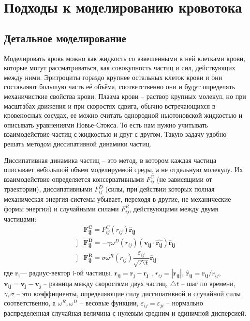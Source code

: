 \section{Подходы к моделированию кровотока}
\subsection{Детальное моделирование}
Моделировать кровь можно как жидкость со взвешенными в ней клетками крови, которые могут рассматриваться, как совокупность частиц и сил, действующих между ними. Эритроциты гораздо крупнее остальных клеток крови и они составляют большую часть её объёма, соответственно они и будут определять механичисткие свойства крови. Плазма крови -- раствор крупных молекул, но при масштабах движения и при скоростях сдвига, обычно встречающихся в кровеносных сосудах, ее можно считать однородной ньютоновской жидкостью  и описывать уравнениями Новье-Стокса. То есть нам нужно учитывать взаимодействие частиц с жидкостью и друг с другом. Такую задачу удобно решать методом диссипативной динамики частиц.

Диссипативная динамика частиц -- это метод, в котором каждая частица описывает небольшой объем моделируемой среды, а не отдельную молекулу. Их взаимодействие определяется консервативными $F^C_{ij}$ (не зависящими от 
траектории), диссипативными $F^D_{ij}$ (силы, при действии которых полная механическая энергия  системы убывает, переходя в другие, не механические формы энергии) и случайными силами $F^R_{ij}$, действующими между двумя частицами:
\begin{align*}
  &\mathbf{F^C_{ij}}=F^C_{ij}(r_{ij})\mathbf{\hat{r}{_{ij}}}\\[10pt]]
  &\mathbf{F^D_{ij}}=-\gamma \omega^D(r_{ij}) (\mathbf{v_{ij}} \cdot \mathbf{\hat{r_{ij}}})\mathbf{\hat{r}{_{ij}}}\\[10pt]]
  &\mathbf{F^R_{ij}}=\sigma \omega^R(r_{ij}) \dfrac{\varepsilon_{ij}}{\sqrt{\bigtriangleup t}} \mathbf{\hat{r}{_{ij}}}
\end{align*}
где $\mathbf{r_{i}}$— радиус-вектор i-ой частицы, $\mathbf{r_{ij}}=\mathbf{r_{j}} - \mathbf{r_{j}}$ ,
$r_{ij}=|\mathbf{r_{ij}}|$,
$\mathbf{\hat{r}{_{ij}}}=\mathbf{r_{ij}}/{r_{ij}}$,
$\mathbf{v_{ij}}=\mathbf{v_{j} - \mathbf{v_{j}}}$ -- разница между скоростями двух частиц, $\bigtriangleup t$ -- шаг по времени, $\gamma, \sigma$ -- это  коэффициенты, определяющие силу диссипативной и случайной силы соответственно, а $\omega^R,\omega^D$ -- весовые функции,
${\varepsilon_{ij}={\varepsilon_{ji}}}$ -- нормально распределенная случайная величина с нулевым средним и единичной дисперсией.

